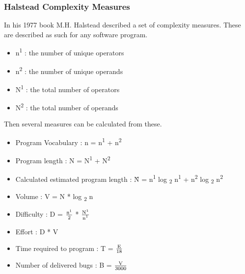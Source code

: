 \subsubsection{Halstead Complexity Measures}
In his 1977 book M.H. Halstead described a set of complexity measures. \cite{HalsteadComplexity}
\newline
These are described as such for any software program.
\begin{itemize}
    \item n\textsuperscript{1} : the number of unique operators
    \item n\textsuperscript{2} : the number of unique operands
    \item N\textsuperscript{1} : the total number of operators
    \item N\textsuperscript{2} : the total number of operands
\end{itemize}
Then several measures can be calculated from these.
\begin{itemize}
    \item Program Vocabulary    : n = n\textsuperscript{1} + n\textsuperscript{2}
    \item Program length        : N = N\textsuperscript{1} + N\textsuperscript{2}
    \item Calculated estimated program length : \^{N} = n\textsuperscript{1} log \textsubscript{2} n\textsuperscript{1} + n\textsuperscript{2} log \textsubscript{2} n\textsuperscript{2}
    \item Volume                : V = N * log \textsubscript{2} n
    \item Difficulty            : D =  $\frac{\text{n\textsuperscript{1}}}{\text{2}}$ * $\frac{\text{N\textsuperscript{1}}}{\text{n\textsuperscript{1}}}$
    \item Effort                : D * V
    \item Time required to program : T = $\frac{\text{E}}{\text{18}}$
    \item Number of delivered bugs : B = $\frac{\text{V}}{\text{3000}}$
\end{itemize}

